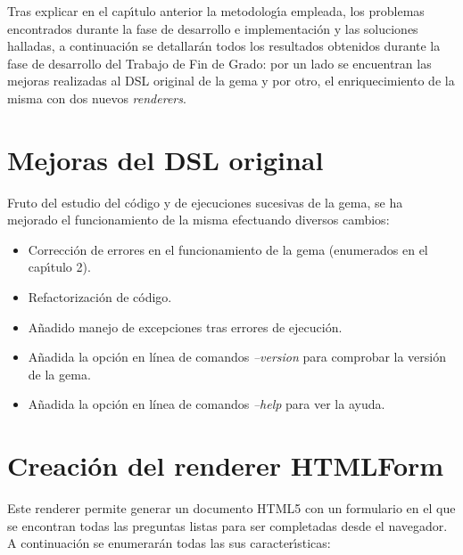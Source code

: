 


Tras explicar en el cap\'{\i}tulo anterior la metodolog\'{\i}a empleada, los problemas encontrados
durante la fase de desarrollo e implementaci\'on y las soluciones halladas, a continuaci\'on se
detallar\'an todos los resultados obtenidos durante la fase de desarrollo del Trabajo de Fin de Grado: 
por un lado se encuentran las mejoras realizadas al DSL original de la gema y por otro, el enriquecimiento
de la misma con dos nuevos \textit{renderers}.

\section{Mejoras del DSL original}
\label{3:sec1}

Fruto del estudio del c\'odigo y de ejecuciones sucesivas de la gema, se ha mejorado el funcionamiento
de la misma efectuando diversos cambios:

\begin{itemize}
  \item Correcci\'on de errores en el funcionamiento de la gema (enumerados en el cap\'{\i}tulo 2).
  \item Refactorizaci\'on de c\'odigo.
  \item A\~{n}adido manejo de excepciones tras errores de ejecuci\'on.
  \item A\~{n}adida la opci\'on en l\'inea de comandos \textit{--version} para comprobar la versi\'on de la gema. 
  \item A\~{n}adida la opci\'on en l\'inea de comandos \textit{--help} para ver la ayuda. 
\end{itemize}

\section{Creaci\'on del renderer HTMLForm}
\label{3:sec2}

Este renderer permite generar un documento HTML5 con un formulario en el que se encontran todas las
preguntas listas para ser completadas desde el navegador. A continuaci\'on se enumerar\'an todas las sus 
caracter\'{\i}sticas:

